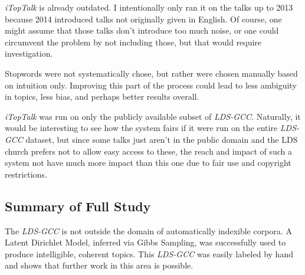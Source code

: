 \emph{iTopTalk} is already outdated. I intentionally only ran it on the talks up to 2013 because 2014 introduced talks not originally given in English. Of course, one might assume that those talks don't introduce too much noise, or one could circumvent the problem by not including those, but that would require investigation.

Stopwords were not systematically chose, but rather were chosen manually based on intuition only. Improving this part of the process could lead to less ambiguity in topics, less bias, and perhaps better results overall.

\emph{iTopTalk} was run on only the publicly available subset of \emph{LDS-GCC}. Naturally, it would be interesting to see how the system fairs if it were run on the entire \emph{LDS-GCC} dataset, but since some talks just aren't in the public domain and the LDS church prefers not to allow easy access to these, the reach and impact of such a system not have much more impact than this one due to fair use and copyright restrictions. 

\subsection{Summary of Full Study}
The \emph{LDS-GCC} is not outside the domain of automatically indexible corpora. A Latent Dirichlet Model, inferred via Gibbs Sampling, was successfully used to produce intelligible, coherent topics. This \emph{LDS-GCC} was easily labeled by hand and shows that further work in this area is possible. 